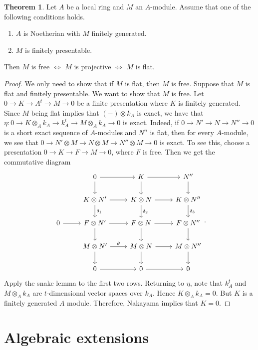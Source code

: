 \documentclass[10pt,letterpaper,cm]{nupset}
\theoremstyle{definition}
\newtheorem{theorem}{Theorem}
\newcommand{\1}{\mathbf{1}}
\newcommand{\0}{\vec 0}
\begin{document}
\begin{theorem}
Let $A$ be a local ring and $M$ an $A$-module. Assume that one of the following conditions holds.
\begin{enumerate}[label=(\alph*)]
\item $A$ is Noetherian with $M$ finitely generated.
\item $M$ is finitely presentable.
\end{enumerate}
Then $M$ is free $\iff$ $M$ is projective $\iff$ $M$ is flat.
\end{theorem}
\begin{proof}
We only need to show that if $M$ is flat, then $M$ is free. Suppose that $M$ is flat and finitely presentable. We want to show that $M$ is free. Let $0 \to K \to A^t \to M \to 0$ be a finite presentation  where $K$ is finitely generated. Since $M$ being flat implies that $(-) \otimes k_A$ is exact, we have that $\eta : 0 \to K \otimes_A k_A \to k_A^t \to M \otimes_A k_A \to 0$ is exact. Indeed, if $0 \to N' \to N \to N'' \to 0$ is a short exact sequence of $A$-modules and $N^n$ is flat, then for every $A$-module, we see that $0 \to N' \otimes M \to N \otimes M \to N'' \otimes M \to 0$ is exact. To see this, choose a presentation $0 \to K \to F \to M \to 0$, where $F$ is free. Then we get the commutative diagram
\[
\begin{tikzcd}
 & 0 \arrow[r] \arrow[d] & K \arrow[r] \arrow[d] & N'' \arrow[d] \\
 & K \otimes N' \arrow[r] \arrow[d, "\delta_1"] & K \otimes N \arrow[r] \arrow[d, "\delta_2"] & K \otimes N'' \arrow[d, "\delta_3"] \\
0 \arrow[r] & F \otimes N' \arrow[r] \arrow[d] & F \otimes N \arrow[r] \arrow[d] & F \otimes N'' \arrow[d] \\
 & M \otimes N' \arrow[r, "\theta"] \arrow[d] & M \otimes N \arrow[r] \arrow[d] & M \otimes N'' \arrow[d] \\
 & 0 \arrow[r] & 0 \arrow[r] & 0
\end{tikzcd}
.\]  Apply the snake lemma to the first two rows.  Returning to $\eta$, note that $k_A^t$ and $M \otimes_A k_A$ are $t$-dimensional vector spaces over $k_A$. Hence $K \otimes_A k_A = 0$. But $K$ is a finitely generated $A$ module. Therefore, Nakayama implies  that $K = 0$. 
\end{proof}

\section{Algebraic extensions}
\end{document}
